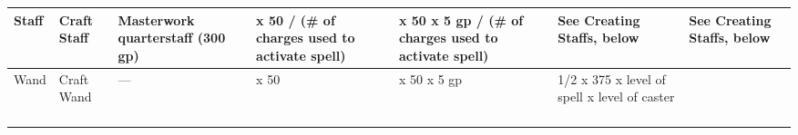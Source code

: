 \begin{longtable}{llllllllllllll}
\hline
\multicolumn{1}{|p{0.472in}|}{\begin{minipage}[t]{0.472in}\centering
Staff \end{minipage}} & \multicolumn{1}{p{0.639in}|}{\begin{minipage}[t]{0.639in}\raggedright
Craft Staff \end{minipage}} & \multicolumn{1}{p{0.497in}|}{\begin{minipage}[t]{0.497in}\raggedright
Masterwork quarterstaff (300 gp)\end{minipage}} & \multicolumn{1}{p{0.564in}|}{\begin{minipage}[t]{0.564in}\raggedright
x 50 / (\# of charges used to activate spell)\end{minipage}} & \multicolumn{1}{p{0.544in}|}{\begin{minipage}[t]{0.544in}\raggedright
x 50 x 5 gp / (\# of charges used to activate spell)\end{minipage}} & \multicolumn{1}{p{0.739in}|}{\begin{minipage}[t]{0.739in}\raggedright
See Creating Staffs, below \end{minipage}} & \multicolumn{8}{p{1.044in}|}{\begin{minipage}[t]{1.044in}\raggedright
See Creating Staffs, below\end{minipage}}\\
\hline
\multicolumn{1}{|p{0.472in}|}{\begin{minipage}[t]{0.472in}\centering
Wand \end{minipage}} & \multicolumn{1}{p{0.639in}|}{\begin{minipage}[t]{0.639in}\raggedright
Craft Wand \end{minipage}} & \multicolumn{1}{p{0.497in}|}{\begin{minipage}[t]{0.497in}\raggedright
--- \end{minipage}} & \multicolumn{1}{p{0.564in}|}{\begin{minipage}[t]{0.564in}\raggedright
x 50 \end{minipage}} & \multicolumn{1}{p{0.544in}|}{\begin{minipage}[t]{0.544in}\raggedright
x 50 \linebreak
x 5 gp \end{minipage}} & \multicolumn{1}{p{0.739in}|}{\begin{minipage}[t]{0.739in}\raggedright
1/2 x 375 x level of spell x level of caster $ $\end{minipage}} & \multicolumn{8}{p{1.044in}|}{\begin{minipage}[t]{1.044in}\raggedright

\end{minipage}}
\end{longtable}
